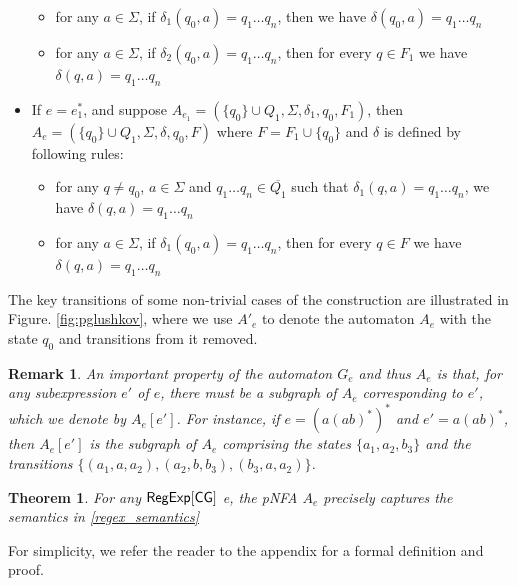 \documentclass[sigplan,review,anonymous]{acmart}\settopmatter{printfolios=true,printccs=false,printacmref=false}
\newtheorem{theorem}{Theorem}
\newtheorem{remark}{Remark}
\begin{document}
\begin{itemize}
\begin{itemize}
    \item for any $a \in \Sigma$, if $\delta_1 (q_0, a) = q_1 \ldots q_n$,
    then we have $\delta (q_0, a) = q_1 \ldots q_n$
    
    \item for any $a \in \Sigma$, if $\delta_2 (q_0, a) = q_1 \ldots q_n$,
    then for every $q \in F_1$ we have $\delta (q, a) = q_1 \ldots q_n$
  \end{itemize}
  \item If $e = e_1^{\ast}$, and suppose $A_{e_1} = (\{ q_0 \} \cup Q_1,
  \Sigma, \delta_1, q_0, F_1)$, then $A_e = (\{ q_0 \} \cup Q_1, \Sigma,
  \delta, q_0, F)$ where $F = F_1 \cup \{ q_0 \}$ and $\delta$ is defined by
  following rules:
  \begin{itemize}
    \item for any $q \neq q_0$, $a \in \Sigma$ and $q_1 \ldots q_n \in
    \overline{Q_1}$ such that $\delta_1 (q, a) = q_1 \ldots q_n$, we have
    $\delta (q, a) = q_1 \ldots q_n$
    
    \item for any $a \in \Sigma$, if $\delta_1 (q_0, a) = q_1 \ldots q_n$,
    then for every $q \in F$ we have $\delta (q, a) = q_1 \ldots q_n$
  \end{itemize}
\end{itemize}

The key transitions of some non-trivial cases of the construction are illustrated in Figure. \ref{fig:pglushkov}, where we use $A'_e$ to denote the automaton $A_e$ with the state $q_0$ and transitions from it removed.

\begin{remark}
 An important property of the automaton $G_e$ and thus $A_e$ is that, for any subexpression $e'$ of $e$, there must be a subgraph of $A_{e}$ corresponding to $e'$, which we denote by $A_{e}[e']$. For instance, if $e = (a (ab)^*)^*$ and $e' = a(ab)^*$, then $A_{e}[e']$ is the subgraph of $A_{e}$ comprising the states $\{a_1, a_2, b_3\}$ and the transitions $\{(a_1, a, a_2), (a_2, b, b_3), (b_3, a, a_2)\}$.
\end{remark}

\begin{theorem}
 \label{theorem_equiv}
 For any ${\sf RegExp}[\sf CG]$ e, the pNFA $A_e$ precisely captures the semantics in \ref{regex_semantics}
\end{theorem}

For simplicity, we refer the reader to the appendix for a formal definition and proof.
\end{document}
